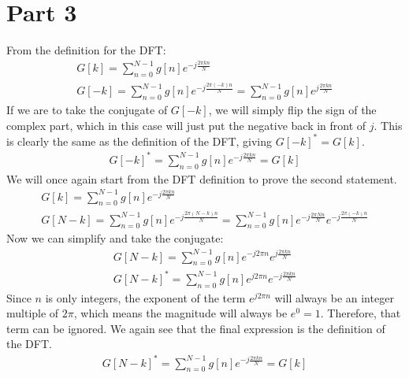 \documentclass[12 pt]{article}
\begin{document}
\section*{Part 3}
From the definition for the DFT:
\begin{align*}
    G[k]=\sum_{n=0}^{N-1}g[n]e^{-j\frac{2\pi kn}{N}} \\
    G[-k] = \sum_{n=0}^{N-1}g[n]e^{-j\frac{2\pi (-k)n}{N}}=\sum_{n=0}^{N-1}g[n]e^{j\frac{2\pi kn}{N}}
\end{align*}
If we are to take the conjugate of $G[-k]$, we will simply flip the sign of the complex part, which in this case will
just put the negative back in front of $j$. This is clearly the same as the definition of the DFT, giving
$G[-k]^*=G[k]$.
\begin{align*}
    G[-k]^*=\sum_{n=0}^{N-1}g[n]e^{-j\frac{2\pi kn}{N}}=G[k]
\end{align*}
We will once again start from the DFT definition to prove the second statement.
\begin{align*}
    G[k]=\sum_{n=0}^{N-1}g[n]e^{-j\frac{2\pi kn}{N}} \\
    G[N-k] =\sum_{n=0}^{N-1}g[n]e^{-j\frac{2\pi (N-k)n}{N}}=\sum_{n=0}^{N-1}g[n]e^{-j\frac{2\pi Nn}{N}}e^{-j\frac{2\pi (-k)n}{N}}
\end{align*}
Now we can simplify and take the conjugate:
\begin{align*}
    G[N-k] = \sum_{n=0}^{N-1}g[n]e^{-j2\pi n}e^{j\frac{2\pi kn}{N}} \\
    G[N-k]^*=\sum_{n=0}^{N-1}g[n]e^{j2\pi n}e^{-j\frac{2\pi kn}{N}}
\end{align*}
Since $n$ is only integers, the exponent of the term $e^{j2\pi n}$ will always be an integer multiple of $2\pi$, which
means the magnitude will always be $e^0=1$. Therefore, that term can be ignored. We again see that the final expression
is the definition of the DFT.
\begin{align*}
    G[N-k]^*=\sum_{n=0}^{N-1}g[n]e^{-j\frac{2\pi kn}{N}}=G[k]
\end{align*}
\end{document}
